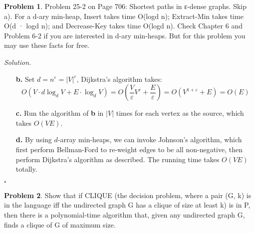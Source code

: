 \documentclass[11pt]{article}
\theoremstyle{definition}
\newtheorem{problem}{Problem}
\newenvironment{solution}{\noindent\emph{Solution.}}{\hfill$\square$}
\newcommand\tab[1][1cm]{\hspace*{#1}}
\begin{document}
\newpage



\begin{problem}
Problem 25-2 on Page 706: Shortest paths in ε-dense graphs. Skip a). For a d-ary min-heap, Insert takes time O(logd n); Extract-Min takes time O(d · logd n); and Decrease-Key takes time O(logd n). Check Chapter 6 and Problem 6-2 if you are interested in d-ary min-heaps. But for this problem you may use these facts for free.
\end{problem}

\begin{solution}

\begin{enumerate}

 \item[\textbf{b.}] \tab Set $d=n^\varepsilon = \vert V \vert^\varepsilon $, Dijkstra's algorithm takes:
 $$ O(V \cdot d \log_d V + E \cdot \log_d V) = O(   \frac{V}{\varepsilon} V^\varepsilon +  \frac{E}{\varepsilon} ) = O(V^{1+\varepsilon} + E) = O(E)$$
 
 
 \item[\textbf{c.}] \tab Run the algorithm of \textbf{b} in $\vert V \vert$ times for each vertex as the source, which takes $O(VE)$.
 
 
 \item[\textbf{d.}]  \tab By using $d$-array min-heaps, we can invoke Johnson's algorithm, which first perform Bellman-Ford to re-weight edges to be all non-negative, then perform Dijkstra's algorithm as described. The running time takes $O(VE)$ totally.






    
\end{enumerate}


\end{solution}

\newpage



\begin{problem}
Show that if CLIQUE (the decision problem, where a pair (G, k) is in the language iff the undirected graph G has a clique of size at least k) is in P, then there is a polynomial-time algorithm that, given any undirected graph G, finds a clique of G of maximum size.
\end{problem}
\end{document}

